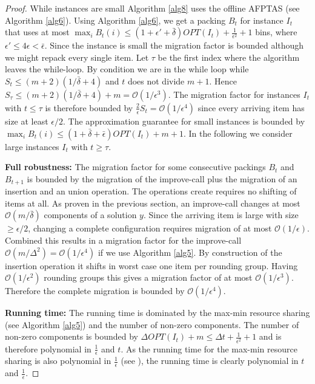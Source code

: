 \documentclass[a4paper,11pt]{article}
\begin{document}
\begin{proof}
	While instances are small Algorithm \ref{alg8} uses the offline AFPTAS (see Algorithm \ref{alg6}). Using Algorithm \ref{alg6}, we get a packing
	$B_t$ for instance $I_t$ that uses at most
	$\max_i B_t(i) \leq (1+ \epsilon' + \bar{\delta})\mathit{OPT}(I_t)+ \frac{1}{\epsilon^2}+1$ bins, where 
	$\epsilon' \leq 4 \epsilon < \bar{\epsilon}$. 
	Since the instance is small
	the migration factor is bounded although we might repack every single item. Let $\tau$ be the first index where
	the algorithm leaves the while-loop. By condition we are in the while loop
	while $S_t \leq (m+2)(1/ \bar{\delta} +4)$ and $t$ does not divide $m+1$. Hence $S_{\tau} \leq 
	(m+2)(1/ \bar{\delta} +4) +m = \mathcal{O}(1/\epsilon^3)$. The migration factor for instances $I_t$ with 
	$t \leq \tau$ is therefore bounded by $\frac{2}{\epsilon} S_t = \mathcal{O}(1/\epsilon^4)$ since every arriving item
	has size at least $\epsilon/2$. The approximation guarantee for small instances is bounded by 
	$\max_i B_t(i) \leq (1+\bar{\delta} + \bar{\epsilon}) \mathit{OPT}(I_t) +m +1$.
	In the following we consider large instances $I_t$ with $t \geq \tau$.
	
	{\bf Full robustness:} The migration factor for some consecutive packings $B_t$ and $B_{t+1}$ is bounded by
	the migration of the improve-call plus the migration of an insertion and an union operation. 
	The operations create requires no shifting of items at all.
	As proven in the previous section, an improve-call changes at most $\mathcal{O}(m/ \bar{\delta})$ components of a solution $y$.
	Since the arriving item is large with size $\geq \epsilon/2$, changing a complete configuration 
	requires migration of at most $\mathcal{O}(1 /\epsilon)$.
	Combined this results in a migration factor for the improve-call $\mathcal{O}(m/\Delta^2) = \mathcal{O}(1/\epsilon^4)$ 
	if we use Algorithm \ref{alg5}.
	By construction of the insertion operation it shifts in worst case one item per 
	rounding group. Having $\mathcal{O}(1/ \epsilon^2)$ rounding groups this gives a migration factor of at most 
	$\mathcal{O}(1/ \epsilon^3)$.
	Therefore the complete migration is bounded by $\mathcal{O}(1/\epsilon^4)$.
	
	{\bf Running time:} The running time is dominated by the max-min resource sharing (see Algorithm \ref{alg5}) and 
	the number of non-zero components. The number of non-zero components is bounded by $\Delta \mathit{OPT}(I_t) +m
	\leq \Delta t + \frac{1}{\epsilon^2} +1$
	and is therefore polynomial in $\frac{1}{\epsilon}$ and $t$. As the running time for the max-min resource sharing
	is also polynomial in $\frac{1}{\epsilon}$ (see \cite{grigoriadis2001approximate}), 
	the running time is clearly polynomial in $t$ and $\frac{1}{\epsilon}$.
	

\end{proof}
\end{document}
